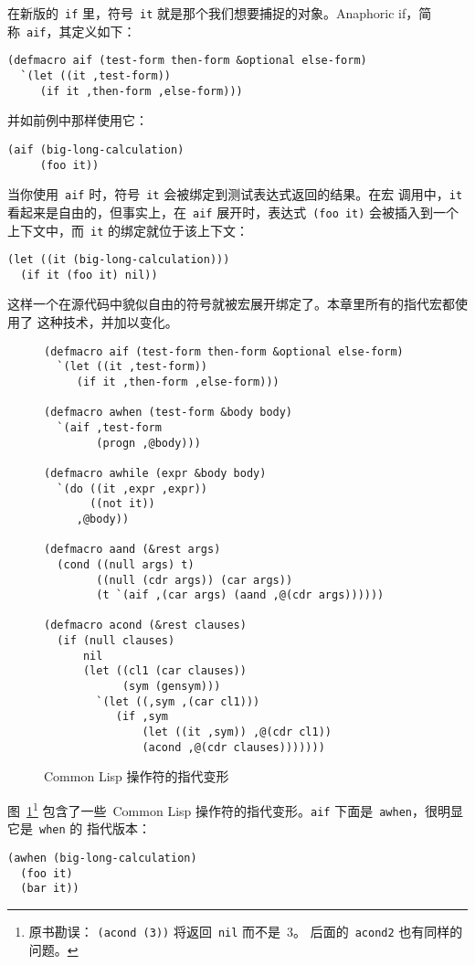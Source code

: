 在新版的~\verb|if| 里，符号~\verb|it| 就是那个我们想要捕捉的对象。Anaphoric
if，简称~\texttt{aif}，其定义如下：
\begin{lstlisting}
(defmacro aif (test-form then-form &optional else-form)
  `(let ((it ,test-form))
     (if it ,then-form ,else-form)))
\end{lstlisting}
并如前例中那样使用它：
\begin{lstlisting}
(aif (big-long-calculation)
     (foo it))
\end{lstlisting}
当你使用~\verb|aif| 时，符号~\verb|it| 会被绑定到测试表达式返回的结果。在宏
调用中，\verb|it| 看起来是自由的，但事实上，在~\verb|aif| 展开时，表达式~\verb|(foo it)| 
会被插入到一个上下文中，而~\verb|it| 的绑定就位于该上下文：
\begin{lstlisting}
(let ((it (big-long-calculation)))
  (if it (foo it) nil))
\end{lstlisting}
这样一个在源代码中貌似自由的符号就被宏展开绑定了。本章里所有的指代宏都使用了
这种技术，并加以变化。

\begin{figure}
\begin{lstlisting}
(defmacro aif (test-form then-form &optional else-form)
  `(let ((it ,test-form))
     (if it ,then-form ,else-form)))

(defmacro awhen (test-form &body body)
  `(aif ,test-form
        (progn ,@body)))

(defmacro awhile (expr &body body)
  `(do ((it ,expr ,expr))
       ((not it))
     ,@body))

(defmacro aand (&rest args)
  (cond ((null args) t)
        ((null (cdr args)) (car args))
        (t `(aif ,(car args) (aand ,@(cdr args))))))

(defmacro acond (&rest clauses)
  (if (null clauses)
      nil
      (let ((cl1 (car clauses))
            (sym (gensym)))
        `(let ((,sym ,(car cl1)))
           (if ,sym
               (let ((it ,sym)) ,@(cdr cl1))
               (acond ,@(cdr clauses)))))))
\end{lstlisting}
  \caption{Common Lisp 操作符的指代变形}
  \label{fig:anaphoric_variants_of_common_lisp_operators}
\end{figure}

图~\ref{fig:anaphoric_variants_of_common_lisp_operators}\footnote{原书勘误：
  \texttt{(acond (3))} 将返回~\texttt{nil} 而不是~3。
  后面的~\texttt{acond2} 也有同样的问题。} 包含了一些~Common Lisp
操作符的指代变形。\texttt{aif} 下面是~\texttt{awhen}，很明显它是~\texttt{when} 的
指代版本：
\begin{lstlisting}
(awhen (big-long-calculation)
  (foo it)
  (bar it))
\end{lstlisting}

